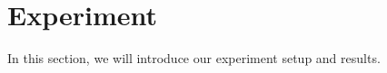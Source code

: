 \section{Experiment}
\label{sec:experiment}
In this section, we will introduce our experiment setup and results.

